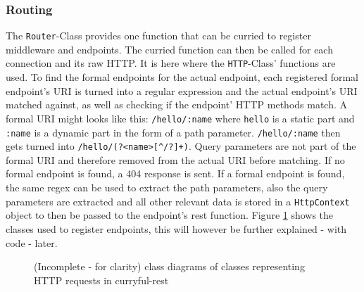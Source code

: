 \documentclass[a4paper,titlepage]{article}
\newenvironment{enum}[3][]%
{
\begin{classAndInterfaceCommon}{#1}{#2}{#3}
}%
{\node[umlcd style enum, anchor=north] (\umlcdClassName) at (\umlcdClassPos)
    {$<<$enumeration$>>$ \\ \textbf{\umlcdClassName}
\nodepart{second}
\umlcdClassAttributes
};
\end{classAndInterfaceCommon}
}
\begin{document}
\subsubsection{Routing}
The \verb|Router|-Class provides one function that can be curried to register
middleware and endpoints. The curried function can then be called for each
connection and its raw HTTP. It is here where the \verb|HTTP|-Class' functions
are used. To find the formal endpoints for the actual endpoint, each registered
formal endpoint's URI is turned into a regular expression and the actual
endpoint's URI matched against, as well as checking if the endpoint' HTTP
methods match. A formal URI might looks like this: \verb|/hello/:name| where
\verb|hello| is a static part and \verb|:name| is a dynamic part in the form of
a path parameter. \verb|/hello/:name| then gets turned into
\verb|/hello/(?<name>[^/?]+)|. Query parameters are not part of the formal URI
and therefore removed from the actual URI before matching. If no formal endpoint
is found, a 404 response is sent. If a formal endpoint is found, the same regex
can be used to extract the path parameters, also the query parameters are
extracted and all other relevant data is stored in a \verb|HttpContext| object
to then be passed to the endpoint's rest function.
Figure \ref{figure:routing-classes} shows the classes used to register
endpoints, this will however be further explained - with code - later.

\begin{figure}[H]
	\begin{center}
	\end{center}
	\caption{(Incomplete - for clarity) class diagrams of classes representing
		HTTP requests in curryful-rest}
	\label{figure:routing-classes}
\end{figure}
\end{document}
